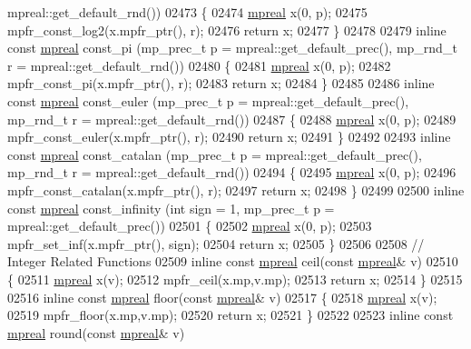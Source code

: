 \begin{DoxyCode}
{{      mpreal::get\_default\_rnd())
02473 \{
02474     \hyperlink{classmpfr_1_1mpreal}{mpreal} x(0, p);
02475     mpfr\_const\_log2(x.mpfr\_ptr(), r);
02476     \textcolor{keywordflow}{return} x;
02477 \}
02478 
02479 \textcolor{keyword}{inline} \textcolor{keyword}{const} \hyperlink{classmpfr_1_1mpreal}{mpreal} const\_pi (mp\_prec\_t p = mpreal::get\_default\_prec(), mp\_rnd\_t r = 
      mpreal::get\_default\_rnd())
02480 \{
02481     \hyperlink{classmpfr_1_1mpreal}{mpreal} x(0, p);
02482     mpfr\_const\_pi(x.mpfr\_ptr(), r);
02483     \textcolor{keywordflow}{return} x;
02484 \}
02485 
02486 \textcolor{keyword}{inline} \textcolor{keyword}{const} \hyperlink{classmpfr_1_1mpreal}{mpreal} const\_euler (mp\_prec\_t p = mpreal::get\_default\_prec(), mp\_rnd\_t r = 
      mpreal::get\_default\_rnd())
02487 \{
02488     \hyperlink{classmpfr_1_1mpreal}{mpreal} x(0, p);
02489     mpfr\_const\_euler(x.mpfr\_ptr(), r);
02490     \textcolor{keywordflow}{return} x;
02491 \}
02492 
02493 \textcolor{keyword}{inline} \textcolor{keyword}{const} \hyperlink{classmpfr_1_1mpreal}{mpreal} const\_catalan (mp\_prec\_t p = mpreal::get\_default\_prec(), mp\_rnd\_t r = 
      mpreal::get\_default\_rnd())
02494 \{
02495     \hyperlink{classmpfr_1_1mpreal}{mpreal} x(0, p);
02496     mpfr\_const\_catalan(x.mpfr\_ptr(), r);
02497     \textcolor{keywordflow}{return} x;
02498 \}
02499 
02500 \textcolor{keyword}{inline} \textcolor{keyword}{const} \hyperlink{classmpfr_1_1mpreal}{mpreal} const\_infinity (\textcolor{keywordtype}{int} sign = 1, mp\_prec\_t p = mpreal::get\_default\_prec())
02501 \{
02502     \hyperlink{classmpfr_1_1mpreal}{mpreal} x(0, p);
02503     mpfr\_set\_inf(x.mpfr\_ptr(), sign);
02504     \textcolor{keywordflow}{return} x;
02505 \}
02506 
02508 \textcolor{comment}{// Integer Related Functions}
02509 \textcolor{keyword}{inline} \textcolor{keyword}{const} \hyperlink{classmpfr_1_1mpreal}{mpreal} ceil(\textcolor{keyword}{const} \hyperlink{classmpfr_1_1mpreal}{mpreal}& v)
02510 \{
02511     \hyperlink{classmpfr_1_1mpreal}{mpreal} x(v);
02512     mpfr\_ceil(x.mp,v.mp);
02513     \textcolor{keywordflow}{return} x;
02514 \}
02515 
02516 \textcolor{keyword}{inline} \textcolor{keyword}{const} \hyperlink{classmpfr_1_1mpreal}{mpreal} floor(\textcolor{keyword}{const} \hyperlink{classmpfr_1_1mpreal}{mpreal}& v)
02517 \{
02518     \hyperlink{classmpfr_1_1mpreal}{mpreal} x(v);
02519     mpfr\_floor(x.mp,v.mp);
02520     \textcolor{keywordflow}{return} x;
02521 \}
02522 
02523 \textcolor{keyword}{inline} \textcolor{keyword}{const} \hyperlink{classmpfr_1_1mpreal}{mpreal} round(\textcolor{keyword}{const} \hyperlink{classmpfr_1_1mpreal}{mpreal}& v)
}}
\end{DoxyCode}
